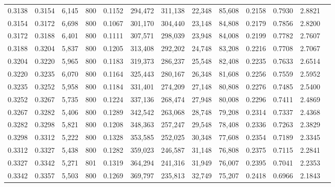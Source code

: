 \begin{tabular}{rrrrrrrrrrrrr}
0.3138 & 0.3154 &  6,145 &   800 &                                     0.1152 & 294,472 & 311,138 &  22,348 &  85,608 & 0.2158 & 0.7930 & 2.8821 \\
0.3154 & 0.3172 &  6,698 &   800 &                                     0.1067 & 301,170 & 304,440 &  23,148 &  84,808 & 0.2179 & 0.7856 & 2.8200 \\
0.3172 & 0.3188 &  6,401 &   800 &                                     0.1111 & 307,571 & 298,039 &  23,948 &  84,008 & 0.2199 & 0.7782 & 2.7607 \\
0.3188 & 0.3204 &  5,837 &   800 &                                     0.1205 & 313,408 & 292,202 &  24,748 &  83,208 & 0.2216 & 0.7708 & 2.7067 \\
0.3204 & 0.3220 &  5,965 &   800 &                                     0.1183 & 319,373 & 286,237 &  25,548 &  82,408 & 0.2235 & 0.7633 & 2.6514 \\
0.3220 & 0.3235 &  6,070 &   800 &                                     0.1164 & 325,443 & 280,167 &  26,348 &  81,608 & 0.2256 & 0.7559 & 2.5952 \\
0.3235 & 0.3252 &  5,958 &   800 &                                     0.1184 & 331,401 & 274,209 &  27,148 &  80,808 & 0.2276 & 0.7485 & 2.5400 \\
0.3252 & 0.3267 &  5,735 &   800 &                                     0.1224 & 337,136 & 268,474 &  27,948 &  80,008 & 0.2296 & 0.7411 & 2.4869 \\
0.3267 & 0.3282 &  5,406 &   800 &                                     0.1289 & 342,542 & 263,068 &  28,748 &  79,208 & 0.2314 & 0.7337 & 2.4368 \\
0.3282 & 0.3298 &  5,821 &   800 &                                     0.1208 & 348,363 & 257,247 &  29,548 &  78,408 & 0.2336 & 0.7263 & 2.3829 \\
0.3298 & 0.3312 &  5,222 &   800 &                                     0.1328 & 353,585 & 252,025 &  30,348 &  77,608 & 0.2354 & 0.7189 & 2.3345 \\
0.3312 & 0.3327 &  5,438 &   800 &                                     0.1282 & 359,023 & 246,587 &  31,148 &  76,808 & 0.2375 & 0.7115 & 2.2841 \\
0.3327 & 0.3342 &  5,271 &   801 &                                     0.1319 & 364,294 & 241,316 &  31,949 &  76,007 & 0.2395 & 0.7041 & 2.2353 \\
0.3342 & 0.3357 &  5,503 &   800 &                                     0.1269 & 369,797 & 235,813 &  32,749 &  75,207 & 0.2418 & 0.6966 & 2.1843 \\

\end{tabular}
